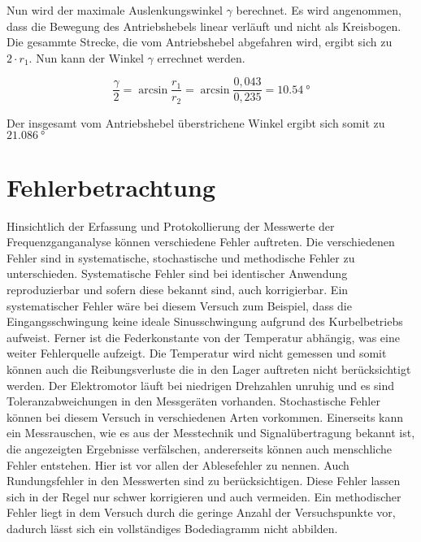 \documentclass[a4paper,12pt]{scrartcl}
\begin{document}
Nun wird der maximale Auslenkungswinkel $\gamma$ berechnet. Es wird angenommen, dass die Bewegung des Antriebshebels linear verläuft und nicht als Kreisbogen.
Die gesammte Strecke, die vom Antriebshebel abgefahren wird, ergibt sich zu $2 \cdot r_1$. Nun kann der Winkel $\gamma$ errechnet werden.

\begin{equation}
	\frac{\gamma}{2} = \arcsin{\frac{r_1}{r_2}} = \arcsin{\frac{0,043}{0,235}} =  \SI{10,54}{\degree}
\end{equation}

Der insgesamt vom Antriebshebel überstrichene Winkel \gamma ergibt sich somit zu $\SI{21,086}{\degree}$

\section{Fehlerbetrachtung}
Hinsichtlich der Erfassung und Protokollierung der Messwerte der Frequenzganganalyse können verschiedene Fehler auftreten. 
Die verschiedenen Fehler sind in systematische, stochastische und methodische Fehler zu unterschieden. 
Systematische Fehler sind bei identischer Anwendung reproduzierbar und sofern diese bekannt sind, auch korrigierbar.
Ein systematischer Fehler wäre bei diesem Versuch zum Beispiel, dass die Eingangsschwingung keine ideale Sinusschwingung aufgrund des Kurbelbetriebs aufweist.
Ferner ist die Federkonstante von der Temperatur abhängig, was eine weiter Fehlerquelle aufzeigt. 
Die Temperatur wird nicht gemessen und somit können auch die Reibungsverluste die in den Lager auftreten nicht berücksichtigt werden.
Der Elektromotor läuft bei niedrigen Drehzahlen unruhig und es sind Toleranzabweichungen in den Messgeräten vorhanden.
Stochastische Fehler können bei diesem Versuch in verschiedenen Arten vorkommen. Einerseits kann ein Messrauschen,
wie es aus der Messtechnik und Signalübertragung bekannt ist, die angezeigten Ergebnisse verfälschen, andererseits können auch menschliche Fehler entstehen.
Hier ist vor allen der Ablesefehler zu nennen. Auch Rundungsfehler in den Messwerten sind zu berücksichtigen. 
Diese Fehler lassen sich in der Regel nur schwer korrigieren und auch vermeiden. 
Ein methodischer Fehler liegt in dem Versuch durch die geringe Anzahl der Versuchspunkte vor, dadurch lässt sich ein vollständiges Bodediagramm nicht abbilden. 
\end{document}
